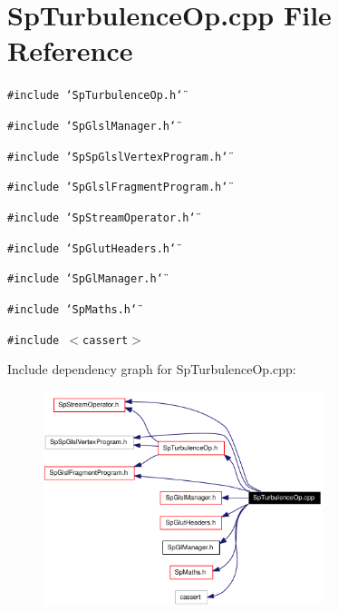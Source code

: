 \section{Sp\-Turbulence\-Op.cpp File Reference}
\label{SpTurbulenceOp_8cpp}
{\tt \#include \char`\"{}Sp\-Turbulence\-Op.h\char`\"{}}\par
{\tt \#include \char`\"{}Sp\-Glsl\-Manager.h\char`\"{}}\par
{\tt \#include \char`\"{}Sp\-Sp\-Glsl\-Vertex\-Program.h\char`\"{}}\par
{\tt \#include \char`\"{}Sp\-Glsl\-Fragment\-Program.h\char`\"{}}\par
{\tt \#include \char`\"{}Sp\-Stream\-Operator.h\char`\"{}}\par
{\tt \#include \char`\"{}Sp\-Glut\-Headers.h\char`\"{}}\par
{\tt \#include \char`\"{}Sp\-Gl\-Manager.h\char`\"{}}\par
{\tt \#include \char`\"{}Sp\-Maths.h\char`\"{}}\par
{\tt \#include $<$cassert$>$}\par


Include dependency graph for Sp\-Turbulence\-Op.cpp:\begin{figure}[H]
\begin{center}
\leavevmode
\includegraphics[width=230pt]{SpTurbulenceOp_8cpp__incl}
\end{center}
\end{figure}
